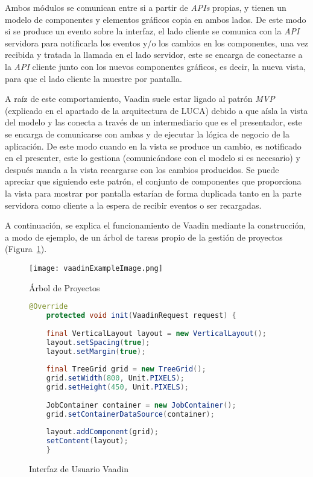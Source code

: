 Ambos módulos se comunican entre si a partir de \emph{APIs}\cite{api} propias, y tienen un modelo de componentes y elementos gráficos copia en ambos lados. De este modo si se produce un evento sobre la interfaz, el lado cliente se comunica con la \emph{API} servidora para notificarla los eventos y/o los cambios en los componentes, una vez recibida y tratada la llamada en el lado servidor, este se encarga de conectarse a la \emph{API} cliente junto con los nuevos componentes gráficos, es decir, la nueva vista, para que el lado cliente la muestre por pantalla.

A raíz de este comportamiento, Vaadin suele estar ligado al patrón \emph{MVP}\cite{mvp} (explicado en el apartado de la arquitectura de LUCA) debido a que aísla la vista del modelo y las conecta a través de un intermediario que es el presentador, este se encarga de comunicarse con ambas y de ejecutar la lógica de negocio de la aplicación. De este modo cuando en la vista se produce un cambio, es notificado en el presenter, este lo gestiona (comunicándose con el modelo si es necesario) y después manda a la vista recargarse con los cambios producidos. Se puede apreciar que siguiendo este patrón, el conjunto de componentes que proporciona la vista para mostrar por pantalla estarían de forma duplicada tanto en la parte servidora como cliente a la espera de recibir eventos o ser recargadas.


A continuación, se explica el funcionamiento de Vaadin mediante la construcción, a modo de ejemplo, de un árbol de tareas propio de la gestión de proyectos  (Figura~\ref{fig:vaadinExampleImage}).

\begin{figure}[!tb]
	\centering
	\texttt{[image: vaadinExampleImage.png]}
	\caption{Árbol de Proyectos}
	\label{fig:vaadinExampleImage}
\end{figure}

\begin{figure}[!tb]
	\centering
	\begin{lstlisting}[language=Java]
	@Override
	protected void init(VaadinRequest request) {
	
	final VerticalLayout layout = new VerticalLayout();
	layout.setSpacing(true);
	layout.setMargin(true);
	
	final TreeGrid grid = new TreeGrid();
	grid.setWidth(800, Unit.PIXELS);
	grid.setHeight(450, Unit.PIXELS);
	
	JobContainer container = new JobContainer();
	grid.setContainerDataSource(container);
	
	layout.addComponent(grid);
	setContent(layout);
	}
	\end{lstlisting}
	\vspace{-15pt}
	\caption{Interfaz de Usuario Vaadin}
	\label{fig:uiVaadin}
\end{figure}

